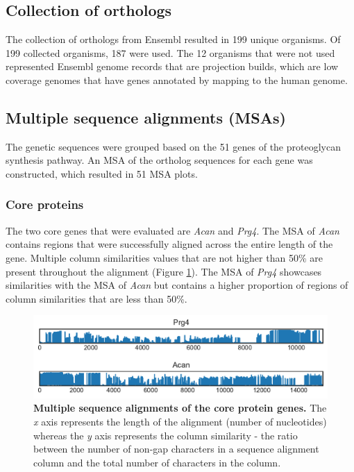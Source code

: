 \documentclass{article}
\begin{document}
\subsection{Collection of orthologs}
The collection of orthologs from Ensembl resulted in 199 unique organisms. Of 199 collected organisms, 187 were used. The 12 organisms that were not used represented Ensembl genome records that are projection builds, which are low coverage genomes that have genes annotated by mapping to the human genome. 

\subsection{Multiple sequence alignments (MSAs)}
The genetic sequences were grouped based on the 51 genes of the proteoglycan synthesis pathway. An MSA of the ortholog sequences for each gene was constructed, which resulted in 51 MSA plots. 

\subsubsection{Core proteins}
The two core genes that were evaluated are \textit{Acan} and \textit{Prg4}. The MSA of \textit{Acan} contains regions that were successfully aligned across the entire length of the gene. Multiple column similarities values that are not higher than 50\% are present throughout the alignment (Figure \ref{msa_fig_1}). The MSA of \textit{Prg4} showcases similarities with the MSA of \textit{Acan} but contains a higher proportion of regions of column similarities that are less than 50\%.

\begin{figure}
\centering
\includegraphics[width=\textwidth]{./images/coreprotein_msa.pdf}
\caption{\textbf{Multiple sequence alignments of the core protein genes.} The \textit{x} axis represents the length of the alignment (number of nucleotides) whereas the \textit{y} axis represents the column similarity - the ratio between the number of non-gap characters in a sequence alignment column and the total number of characters in the column.}
\label{msa_fig_1}
\end{figure}
\end{document}

